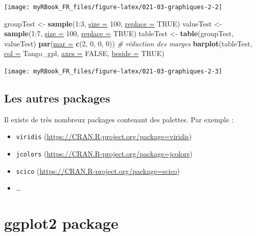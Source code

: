 \documentclass[twoside,symmetric]{book}
\newenvironment{Shaded}{}{}
\newcommand{\CommentTok}[1]{\textit{#1}}
\newcommand{\DataTypeTok}[1]{\underline{#1}}
\newcommand{\DecValTok}[1]{#1}
\newcommand{\KeywordTok}[1]{\textbf{#1}}
\newcommand{\NormalTok}[1]{#1}
\newcommand{\OperatorTok}[1]{#1}
\newcommand{\OtherTok}[1]{#1}
\newcommand{\StringTok}[1]{#1}
\providecommand{\tightlist}{%
  \setlength{\itemsep}{0pt}\setlength{\parskip}{0pt}}
\begin{document}
\texttt{[image: myRBook\_FR\_files/figure-latex/021-03-graphiques-2-2]}

\begin{Shaded}
\begin{Highlighting}[]
\NormalTok{groupTest <-}\StringTok{ }\KeywordTok{sample}\NormalTok{(}\DecValTok{1}\OperatorTok{:}\DecValTok{3}\NormalTok{, }\DataTypeTok{size =} \DecValTok{100}\NormalTok{, }\DataTypeTok{replace =} \OtherTok{TRUE}\NormalTok{) }
\NormalTok{valueTest <-}\StringTok{ }\KeywordTok{sample}\NormalTok{(}\DecValTok{1}\OperatorTok{:}\DecValTok{7}\NormalTok{, }\DataTypeTok{size =} \DecValTok{100}\NormalTok{, }\DataTypeTok{replace =} \OtherTok{TRUE}\NormalTok{)}
\NormalTok{tableTest <-}\StringTok{ }\KeywordTok{table}\NormalTok{(groupTest, valueTest)}
\KeywordTok{par}\NormalTok{(}\DataTypeTok{mar =} \KeywordTok{c}\NormalTok{(}\DecValTok{2}\NormalTok{, }\DecValTok{0}\NormalTok{, }\DecValTok{0}\NormalTok{, }\DecValTok{0}\NormalTok{)) }\CommentTok{# réduction des marges}
\KeywordTok{barplot}\NormalTok{(tableTest, }
  \DataTypeTok{col =}\NormalTok{ Tango_gpl, }\DataTypeTok{axes =} \OtherTok{FALSE}\NormalTok{, }\DataTypeTok{beside =} \OtherTok{TRUE}\NormalTok{)}
\end{Highlighting}
\end{Shaded}

\texttt{[image: myRBook\_FR\_files/figure-latex/021-03-graphiques-2-3]}

\hypertarget{les-autres-packages}{%
\subsection{Les autres packages}\label{les-autres-packages}}

Il existe de très nombreux packages contenant des palettes. Par exemple :

\begin{itemize}
\tightlist
\item
  \texttt{viridis} (\url{https://CRAN.R-project.org/package=viridis})
\item
  \texttt{jcolors} (\url{https://CRAN.R-project.org/package=jcolors})
\item
  \texttt{scico} (\url{https://CRAN.R-project.org/package=scico})
\item
  \ldots{}
\end{itemize}

\hypertarget{ggplot2-package}{%
\section{ggplot2 package}\label{ggplot2-package}}
\end{document}
